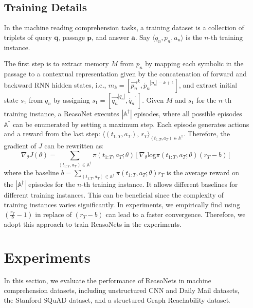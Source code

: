 \documentclass[sigconf]{acmart}
\begin{document}

\subsection{Training Details}
\label{sec:train_detail}
In the machine reading comprehension tasks, a training dataset is a collection of triplets of query $\mathbf{q}$, passage $\mathbf{p}$, and answer $\mathbf{a}$. Say $\langle q_n, p_n, a_n\rangle$ is the $n$-th training instance. 

The first step is to extract memory $M$ from $p_n$ by mapping each symbolic in the passage to a contextual representation given by the concatenation of forward and backward RNN hidden states, i.e., $m_k = [\overrightarrow{p_{n}}^k, \overleftarrow{p_n}^{|p_n|-k + 1}]$, and extract initial state $s_1$ from $q_n$ by assigning $s_1 = [ \overrightarrow{q_n}^{|q_n|}, \overleftarrow{q_n}^1]$.    
Given $M$ and $s_1$ for the $n$-th training instance, a ReasoNet executes $|\mathbb{A}^\dagger|$ episodes, where all possible episodes $\mathbb{A}^\dagger$ can be enumerated by setting a maximum step. Each episode generates actions and a reward from the last step: $\langle (t_{1:T}, a_{T})$, $r_{T}\rangle_{(t_{1:T}, a_T) \in \mathbb{A}^\dagger}$.
Therefore, the gradient of $J$ can be rewritten as:
\[ \nabla_{\theta} J(\theta) = \sum_{(t_{1:T}, a_T) \in \mathbb{A}^\dagger} \pi(t_{1:T}, a_T; \theta) \left[ \nabla_{\theta} \text{log} \pi(t_{1:T}, a_{T}; \theta) ( r_{T} - b) \right]   \]
where the baseline $ b =  \sum_{(t_{1:T}, a_T) \in \mathbb{A}^\dagger} \pi(t_{1:T}, a_T; \theta) r_{T} $ is the average reward on the $|\mathbb{A}^\dagger|$ episodes for the $n$-th training instance.
It allows different baselines for different training instances. This can be beneficial since the complexity of training instances varies significantly. 
In experiments, we empirically find using $( \frac{r_{T}} { b} -1 )$ in replace of  $( r_{T} - b )$ can lead to a faster convergence. Therefore, we adopt this approach to train ReasoNets in the experiments.


\section{Experiments}
\label{sec:exp}
In this section, we evaluate the performance of ReasoNets in machine comprehension datasets, including unstructured CNN and Daily Mail datasets, the Stanford SQuAD dataset, and a structured Graph Reachability dataset.
\end{document}
